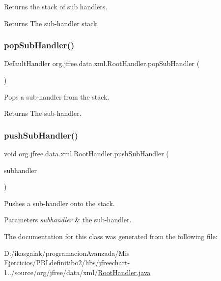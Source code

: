 Returns the stack of sub handlers.

\begin{DoxyReturn}{Returns}
The sub-\/handler stack. 
\end{DoxyReturn}
\mbox{\label{classorg_1_1jfree_1_1data_1_1xml_1_1_root_handler_af02db13e09000892a1baaa86b16efe79}} 
\subsubsection{\texorpdfstring{pop\+Sub\+Handler()}{popSubHandler()}}
{\footnotesize\ttfamily Default\+Handler org.\+jfree.\+data.\+xml.\+Root\+Handler.\+pop\+Sub\+Handler (\begin{DoxyParamCaption}{ }\end{DoxyParamCaption})}

Pops a sub-\/handler from the stack.

\begin{DoxyReturn}{Returns}
The sub-\/handler. 
\end{DoxyReturn}
\mbox{\label{classorg_1_1jfree_1_1data_1_1xml_1_1_root_handler_a757bd4a9107736cd165c5bb5d6988b8a}} 
\subsubsection{\texorpdfstring{push\+Sub\+Handler()}{pushSubHandler()}}
{\footnotesize\ttfamily void org.\+jfree.\+data.\+xml.\+Root\+Handler.\+push\+Sub\+Handler (\begin{DoxyParamCaption}\item[{Default\+Handler}]{subhandler }\end{DoxyParamCaption})}

Pushes a sub-\/handler onto the stack.


\begin{DoxyParams}{Parameters}
{\em subhandler} & the sub-\/handler. \\
\hline
\end{DoxyParams}


The documentation for this class was generated from the following file\+:\begin{DoxyCompactItemize}
\item 
D\+:/ikasgaiak/programacion\+Avanzada/\+Mis Ejercicios/\+P\+B\+Ldefinitibo2/libs/jfreechart-\/1../source/org/jfree/data/xml/\mbox{\hyperlink{_root_handler_8java}{Root\+Handler.\+java}}\end{DoxyCompactItemize}
